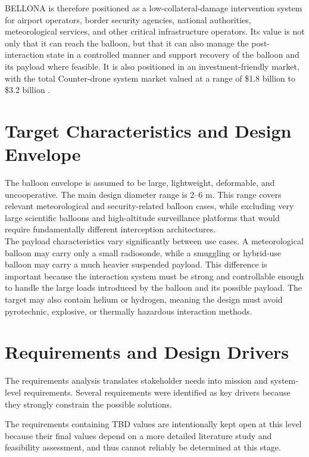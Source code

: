 BELLONA is therefore positioned as a low-collateral-damage intervention system for airport operators, border security agencies, national authorities, meteorological services, and other critical infrastructure operators. Its value is not only that it can reach the balloon, but that it can also manage the post-interaction state in a controlled manner and support recovery of the balloon and its payload where feasible. It is also positioned in an investment-friendly market, with the total Counter-drone system market valued at a range of 
\$1.8 billion \cite{FutureDataStats2024Counter-Drone2024} to \$3.2 billion \cite{GrandViewResearch2025Anti-Drone20252033}.

\section*{Target Characteristics and Design Envelope}

The balloon envelope is assumed to be large, lightweight, deformable, and uncooperative. The main design diameter range is 2--6 m. This range covers relevant meteorological and security-related balloon cases, while excluding very large scientific balloons and high-altitude surveillance platforms that would require fundamentally different interception architectures.
\\

The payload characteristics vary significantly between use cases. A meteorological balloon may carry only a small radiosonde, while a smuggling or hybrid-use balloon may carry a much heavier suspended payload. This difference is important because the interaction system must be strong and controllable enough to handle the large loads introduced by the balloon and its possible payload. The target may also contain helium or hydrogen, meaning the design must avoid pyrotechnic, explosive, or thermally hazardous interaction methods.

\section*{Requirements and Design Drivers}

The requirements analysis translates stakeholder needs into mission and system-level requirements. Several requirements were identified as key drivers because they strongly constrain the possible solutions.

The requirements containing TBD values are intentionally kept open at this level because their final values depend on a more detailed literature study and feasibility assessment, and thus cannot reliably be determined at this stage.

